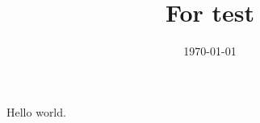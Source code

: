 \documentclass[a4paper]{amsart}
\title{For test}
\date{\today}
\begin{document}
Hello world.
\end{document}
